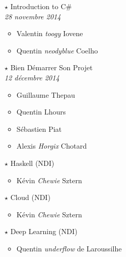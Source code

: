 \documentclass[a4paper]{article}
\begin{document}
\begin{multicols*}{2}
\begin{itemize}
            \vspace{0.3cm}

        \item[$\star$] Introduction to C\#\\
            \emph{28 novembre 2014}
            \begin{itemize}
                \item Valentin \emph{toogy} Iovene
                \item Quentin \emph{neodyblue} Coelho
            \end{itemize}

            \vspace{0.3cm}

        \item[$\star$] Bien Démarrer Son Projet\\
            \emph{12 décembre 2014}
            \begin{itemize}
                \item Guillaume Thepau
                \item Quentin Lhours
                \item Sébastien Piat
                \item Alexis \emph{Horgix} Chotard
            \end{itemize}

            \vspace{0.3cm}

        \item[$\star$] Haskell (NDI)
            \begin{itemize}
                \item Kévin \emph{Chewie} Sztern
            \end{itemize}

            \vspace{0.3cm}

        \item[$\star$] Cloud (NDI)
            \begin{itemize}
                \item Kévin \emph{Chewie} Sztern
            \end{itemize}

            \vspace{0.3cm}

        \item[$\star$] Deep Learning (NDI)
            \begin{itemize}
                \item Quentin \emph{underflow} de Laroussilhe
            \end{itemize}


\end{itemize}
\end{multicols*}
\end{document}

